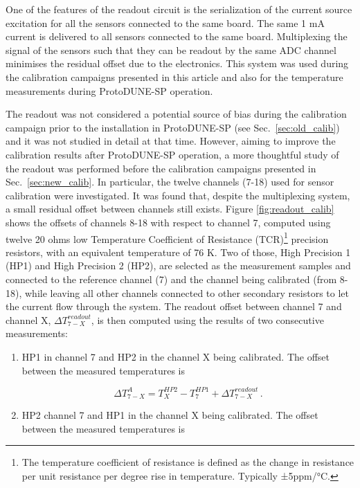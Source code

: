 \noindent
One of the features of the readout circuit is the serialization of the current source excitation for all the sensors connected to the same board. The same 1 mA current is delivered to all sensors connected to the same board. Multiplexing the signal of the sensors such that they can be readout by the same ADC channel minimises the residual offset due to the electronics. This system was used during the calibration campaigns presented in this article and also for the temperature measurements during ProtoDUNE-SP operation. 

The readout was not considered a potential source of bias during the calibration campaign prior to the installation in ProtoDUNE-SP (see Sec.~\ref{sec:old_calib}) and it was not studied in detail at that time. However, aiming to improve the calibration results after ProtoDUNE-SP operation, a more thoughtful study of the readout was performed before the calibration campaigns presented in Sec.~\ref{sec:new_calib}. In particular, the twelve channels (7-18) used for sensor calibration were investigated. It was found that, despite the multiplexing system, a small residual offset between channels still exists. Figure \ref{fig:readout_calib} shows the offsets of channels 8-18 with respect to channel 7, computed using twelve 20 ohms low Temperature Coefficient of Resistance (TCR)\footnote{The temperature coefficient of resistance is defined as the change in resistance per unit resistance per degree rise in temperature. Typically ±5ppm/°C.} precision resistors, with an equivalent temperature of 76 K. Two of those, High Precision 1 (HP1) and High Precision 2 (HP2), are selected as the measurement samples and connected to the reference channel (7) and the channel being calibrated (from 8-18), while leaving all other channels connected to other secondary resistors to let the current flow through the system. The readout offset between channel 7 and channel X, $\Delta T_{7-X}^{readout}$, is then computed using the results of two consecutive measurements:

\begin{enumerate}%
    \item HP1 in channel 7 and HP2 in the channel X being calibrated. The offset between the measured temperatures is 

    \begin{equation}
        \Delta T_{7-X}^A = T_{X}^{HP2}-T_{7}^{HP1}+\Delta T_{7-X}^{readout} \, .
    \end{equation}  
    
    \item HP2 channel 7 and HP1 in the channel X being calibrated. The offset between the measured temperatures is
\end{enumerate}

